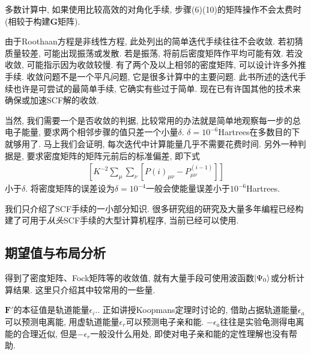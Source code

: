 多数计算中, 如果使用比较高效的对角化手续, 步骤(6)(10)的矩阵操作不会太费时(相较于构建$\mathbf{G}$矩阵).

由于Roothaan方程是非线性方程, 此处列出的简单迭代手续往往不会收敛. 若初猜质量较差, 可能出现振荡或发散. 若是振荡, 将前后密度矩阵作平均可能有效. 若没收敛, 可能指示因为收敛较慢. 有了两个及以上相邻的密度矩阵, 可以设计许多外推手续. 收敛问题不是一个平凡问题, 它是很多计算中的主要问题. 此书所述的迭代手续也许是可尝试的最简单手续, 它确实有些过于简单. 现在已有许国其他的技术来确保或加速SCF解的收敛.

当然, 我们需要一个是否收敛的判据, 比较常用的办法就是简单地观察每一步的总电子能量, 要求两个相邻步骤的值只差一个小量$\delta$. $\delta=10^{-6}$Hartrees在多数目的下就够用了. 马上我们会证明, 每次迭代中计算能量几乎不需要花费时间. 另外一种判据是, 要求密度矩阵的矩阵元前后的标准偏差, 即下式
\begin{align*}
\left[ K^{-2}\sum_\mu\sum_\nu[P{(i)}_{\mu\nu}-P^{(i-1)}_{\mu\nu} ] \right]
\end{align*} 
小于$\delta$. 将密度矩阵的误差设为$\delta=10^{-4}$一般会使能量误差小于$10^{-6}$Hartrees.

我们只介绍了SCF手续的一小部分知识. 很多研究组的研究及大量多年编程已经构建了可用于\emph{从头}SCF手续的大型计算机程序, 当前已经可以使用.
\subsection{期望值与布局分析}
得到了密度矩阵、Fock矩阵等的收敛值, 就有大量手段可使用波函数$\Ket{\Psi_0}$或分析计算结果. 这里只介绍其中较常用的一些量.

$\mathbf{F'}$的本征值是轨道能量$\epsilon_i$.. 正如讲授Koopmans定理时讨论的, 借助占据轨道能量$\epsilon_a$可以预测电离能, 用虚轨道能量$\epsilon_r$可以预测电子亲和能. $-\epsilon_a$往往是实验龟测得电离能的合理近似, 但是$-\epsilon_r$一般没什么用处, 即使对电子亲和能的定性理解也没有帮助.

